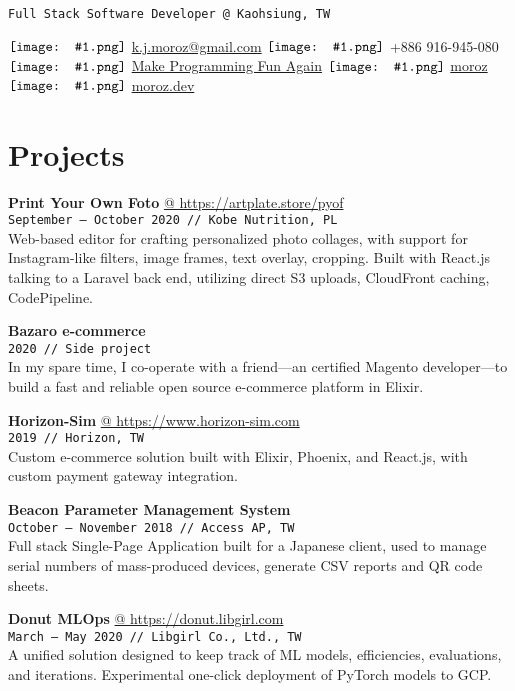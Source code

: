 \documentclass[10pt,a4paper]{article}
\author{Karol Moroz}
\makeatletter
\newcommand{\icon}[1]{$\vcenter{\hbox{\texttt{[image: \#1.png]}}}$\hspace{.2em}}
\newcommand{\project}[3]{\par\vspace{1em}\textbf{\normalsize #1}\\{\footnotesize\texttt{#2 // #3}}\\[4pt]}
\newcommand{\projectweb}[4]{\par\vspace{1em}\textbf{\normalsize #1} \href{#2}{\color{darkgray} @ #2}\\{\footnotesize\texttt{#3 // #4}}\\[4pt]}
\makeatother
\begin{document}
\pagestyle{empty}

\texttt{Full Stack Software Developer @ Kaohsiung, TW}

\icon{email}
\href{mailto:k.j.moroz@gmail.com}{k.j.moroz@gmail.com} \hfill
\icon{telephone} +886 916-945-080 \hfill
\icon{youtube} \href{https://www.youtube.com/channel/UCW_YiVuoo-WG0bxQElVgxAg}{Make Programming Fun Again} \hfill
\icon{github} \href{https://github.com/moroz}{moroz} \hfill
\icon{web} \href{https://www.moroz.dev}{moroz.dev}

\begin{minipage}[t]{0.67\textwidth}
  \raggedright
  \section{Projects}
  \vspace*{-6pt}

  \projectweb{Print Your Own Foto}{https://artplate.store/pyof}{September {–} October 2020}{Kobe Nutrition, PL}

  \small
  Web-based editor for crafting personalized photo collages, with support for Instagram-like filters, image frames, text overlay, cropping. Built with React.js talking to a Laravel back end, utilizing direct S3 uploads, CloudFront caching, CodePipeline.

  \project{Bazaro e-commerce}{2020}{Side project}

  \small
  In my spare time, I co-operate with a friend---an certified Magento developer---to build a fast and reliable open source e-commerce platform in Elixir.

  \projectweb{Horizon-Sim}{https://www.horizon-sim.com}{2019}{Horizon, TW}

  \small
  Custom e-commerce solution built with Elixir, Phoenix, and React.js, with custom payment gateway integration.

  \project{Beacon Parameter Management System}{October {–} November 2018}{Access AP, TW}

  \small
  Full stack Single-Page Application built for a Japanese client, used to manage serial numbers of mass-produced
  devices, generate CSV reports and QR code sheets.

  \projectweb{Donut MLOps}{https://donut.libgirl.com}{March {–} May 2020}{Libgirl Co., Ltd., TW}

  \small
  A unified solution designed to keep track of ML models, efficiencies, evaluations, and iterations. Experimental one-click deployment of PyTorch models to GCP.


\end{minipage}
\end{document}
